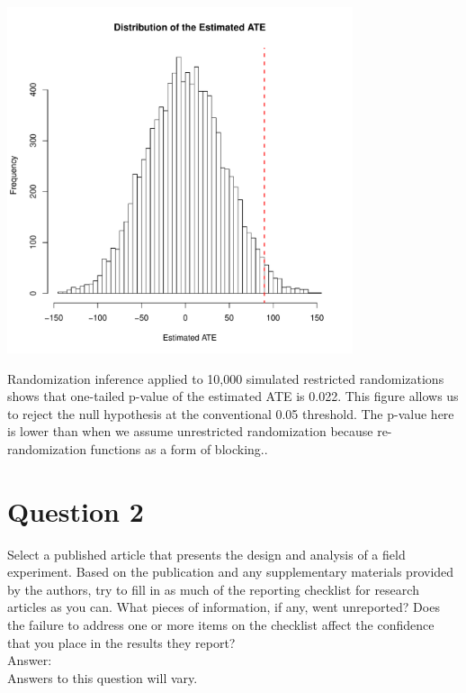 \documentclass[11pt,notitlepage]{article}\usepackage[]{graphicx}\usepackage[]{color}
\newenvironment{knitrout}{}{} %
\begin{document}
\begin{enumerate}[a)]
\begin{knitrout}
{\centering \includegraphics[width=4in,height=4in]{figure/PS13-unnamed-chunk-4-1} 

}



\end{knitrout}

Randomization inference applied to 10,000 simulated restricted randomizations shows that one-tailed p-value of the estimated ATE is 0.022. This figure allows us to reject the null hypothesis at the conventional 0.05 threshold.  The p-value here is lower than when we assume unrestricted randomization because re-randomization functions as a form of blocking..
\end{enumerate}

\section*{Question 2}
Select a published article that presents the design and analysis of a field experiment. Based on the publication and any supplementary materials provided by the authors, try to fill in as much of the reporting checklist for research articles as you can. What pieces of information, if any, went unreported? Does the failure to address one or more items on the checklist affect the confidence that you place in the results they report?\\
Answer:\\
Answers to this question will vary.
\end{document}

